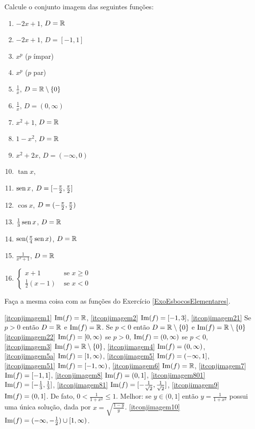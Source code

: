 \begin{exo} Calcule o conjunto imagem das seguintes funções: 
\begin{multicols}{3}
\begin{enumerate}
\item\label{itconjimagem1} $-2x+1$, $D=\mathbb{R}$
\item\label{itconjimagem2} $-2x+1$, $D=[-1,1]$
\item\label{itconjimagem21} $x^p$ ($p$ ímpar) 
\item\label{itconjimagem22} $x^p$ ($p$ par)
\item\label{itconjimagem3} $\tfrac{1}{x}$, $D=\mathbb{R}\setminus \{0\}$
\item\label{itconjimagem4} $\tfrac{1}{x}$, $D=(0,\infty)$
\item\label{itconjimagem5a} $x^2+1$, $D=\mathbb{R}$
\item\label{itconjimagem5} $1-x^2$, $D=\mathbb{R}$
\item\label{itconjimagem51} $x^2+2x$, $D=(-\infty,0)$
\item\label{itconjimagem6} $\tan x$,
\item\label{itconjimagem7} $\operatorname{sen} x$, $D=[-\tfrac{\pi}{2},\tfrac{\pi}{2}]$
\item\label{itconjimagem8} $\cos x$, $D=(-\tfrac{\pi}{2},\tfrac{\pi}{2})$
\item\label{itconjimagem801} $\tfrac13\operatorname{sen} x$, $D=\mathbb{R}$
\item\label{itconjimagem81} $\operatorname{sen} (\tfrac{\pi}{4}\operatorname{sen} x)$, $D=\mathbb{R}$
\item\label{itconjimagem9} $\frac{1}{x^2+1}$, $D=\mathbb{R}$ 
\item\label{itconjimagem10} $\begin{cases}x+1&\text{ se }x\geq0\\\tfrac12(x-1)&\text{ se } x<0\end{cases}$
\end{enumerate}
\end{multicols}
\vspace{0.01cm}
Faça a mesma coisa com as funções do Exercício \eqref{ExoEsbocosElementares}.
\begin{sol}
\eqref{itconjimagem1} $\operatorname{Im}(f)=\mathbb{R}$,
\eqref{itconjimagem2} $\operatorname{Im}(f)=[-1,3]$,
\eqref{itconjimagem21} Se $p>0$ então $D=\mathbb{R}$ e $\operatorname{Im}(f)=\mathbb{R}$. Se 
$p<0$ então $D=\mathbb{R}\setminus\{0\}$ e $\operatorname{Im}(f)=\mathbb{R}\setminus\{0\}$
\eqref{itconjimagem22} $\operatorname{Im}(f)=[0,\infty)$ se $p>0$, $\operatorname{Im}(f)=(0,\infty)$ se $p<0$,
\eqref{itconjimagem3} $\operatorname{Im}(f)=\mathbb{R}\setminus \{0\}$,
\eqref{itconjimagem4} $\operatorname{Im}(f)=(0,\infty)$,
\eqref{itconjimagem5a} $\operatorname{Im}(f)=[1,\infty)$,
\eqref{itconjimagem5} $\operatorname{Im}(f)=(-\infty,1]$,
\eqref{itconjimagem51} $\operatorname{Im}(f)=[-1,\infty)$,
\eqref{itconjimagem6} $\operatorname{Im}(f)=\mathbb{R}$,
\eqref{itconjimagem7} $\operatorname{Im}(f)=[-1,1]$,
\eqref{itconjimagem8} $\operatorname{Im}(f)=(0,1]$,
\eqref{itconjimagem801} $\operatorname{Im}(f)=[-\tfrac13,\tfrac13]$,
\eqref{itconjimagem81} $\operatorname{Im}(f)=[-\tfrac{1}{\sqrt{2}},\tfrac{1}{\sqrt{2}}]$,
\eqref{itconjimagem9} $\operatorname{Im}(f)=(0,1]$. De fato, $0<\frac{1}{1+x^2}\leq 1$. Melhor:
se $y\in (0,1]$ então $y=\frac{1}{1+x^2}$ possui uma única solução, dada por
$x=\sqrt{\frac{1-y}{y}}$.
\eqref{itconjimagem10} $\operatorname{Im}(f)=(-\infty,-\tfrac12)\cup [1,\infty)$.


\end{sol}
\end{exo}
